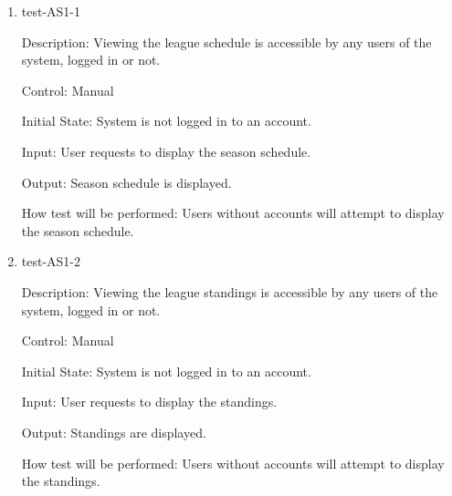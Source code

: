 \documentclass[12pt, titlepage]{article}
\begin{document}
\begin{enumerate}

  \item{test-AS1-1\\}
  
  Description: Viewing the league schedule is accessible by any users of
  the system, logged in or not.

  Control: Manual

  Initial State: System is not logged in to an account.

  Input: User requests to display the season schedule.

  Output: Season schedule is displayed.

  How test will be performed: Users without accounts will attempt to display
  the season schedule.

  \item{test-AS1-2\\}
  
  Description: Viewing the league standings is accessible by any users of
  the system, logged in or not.

  Control: Manual

  Initial State: System is not logged in to an account.

  Input: User requests to display the standings.

  Output: Standings are displayed.

  How test will be performed: Users without accounts will attempt to display
  the standings.









\end{enumerate}
\end{document}
